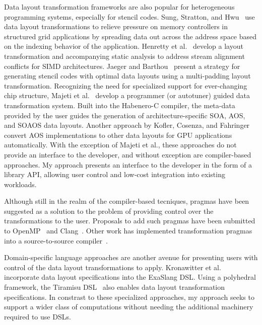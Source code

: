 \documentclass{article}
\begin{document}
Data layout transformation frameworks are also popular for heterogeneous programming systems, especially for stencil codes.
Sung, Stratton, and Hwu~\cite{sung2010data} use data layout transformations to relieve pressure on memory controllers in structured grid applications by spreading data out across the address space based on the indexing behavior of the application.
Henretty et al.~\cite{henretty2011data} develop a layout transformation and accompanying static analysis to address stream alignment conflicts for SIMD architectures.
Jaeger and Barthou~\cite{jaeger2012automatic} present a strategy for generating stencil codes with optimal data layouts using a multi-padding layout transformation.
Recognizing the need for specialized support for ever-changing chip structure, Majeti et al.~\cite{majeti2013compiler} develop a programmer (or autotuner) guided data transformation system.
Built into the Habenero-C compiler, the meta-data provided by the user guides the generation of architecture-specific SOA, AOS, and SOAOS data layouts.
Another approach by Kofler, Cosenza, and Fahringer~\cite{kofler2015automatic} convert AOS implementations to other data layouts for GPU applications automatically.  
With the exception of Majeti et al., these approaches do not provide an interface to the developer, and without exception are compiler-based approaches.
My approach presents an interface to the developer in the form of a library API, allowing user control and low-cost integration into existing workloads.

Although still in the realm of the compiler-based tecniques, pragmas have been suggested as a solution to the problem of providing control over the transformations to the user.
Proposals to add such pragmas have been submitted to OpenMP~\cite{kruse2019design} and Clang~\cite{kruse2018user}.
Other work has implemented transformation pragmas into a source-to-source compiler~\cite{xu2014semi}. 


Domain-specific language approaches are another avenue for presenting users with control of the data layout transformations to apply. 
Kronawitter et al.~\cite{kronawitter2018automatic} incorporate data layout specifications into the ExaSlang DSL.
Using a polyhedral framework, the Tiramisu DSL~\cite{baghdadi2019tiramisu} also enables data layout transformation specifications.
In constrast to these specialized approaches, my approach seeks to support a wider class of computations without needing the additional machinery required to use DSLs. 
\end{document}
